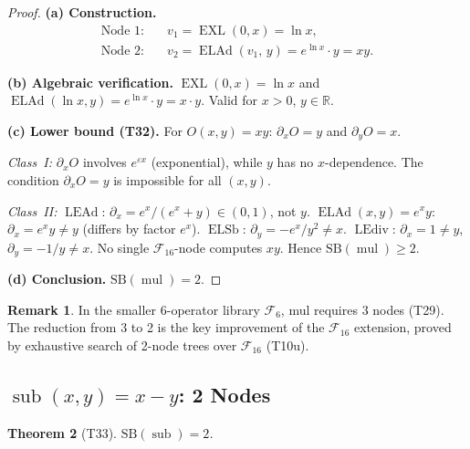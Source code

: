\documentclass[12pt,a4paper]{article}
\newtheorem{theorem}{Theorem}[section]
\theoremstyle{definition}
\newtheorem{remark}[theorem]{Remark}
\newcommand{\EXL}{\operatorname{EXL}}
\newcommand{\ELAd}{\operatorname{ELAd}}
\newcommand{\ELSb}{\operatorname{ELSb}}
\newcommand{\LEAd}{\operatorname{LEAd}}
\newcommand{\LEdiv}{\operatorname{LEdiv}}
\newcommand{\mulop}{\operatorname{mul}}
\newcommand{\subop}{\operatorname{sub}}
\newcommand{\SB}{\mathrm{SB}}
\newcommand{\F}{\mathcal{F}_{16}}
\newcommand{\R}{\mathbb{R}}
\begin{document}
\begin{proof}
\textbf{(a) Construction.}
\begin{align*}
  \text{Node 1:} &\quad v_1 = \EXL(0,x) = \ln x, \\
  \text{Node 2:} &\quad v_2 = \ELAd(v_1,\,y) = e^{\ln x} \cdot y = xy.
\end{align*}

\textbf{(b) Algebraic verification.}
$\EXL(0,x) = \ln x$ and $\ELAd(\ln x, y) = e^{\ln x} \cdot y = x \cdot y$.
Valid for $x > 0$, $y \in \R$.

\textbf{(c) Lower bound (T32).}
For $O(x,y) = xy$: $\partial_x O = y$ and $\partial_y O = x$.

\emph{Class~I:} $\partial_x O$ involves $e^{\varepsilon x}$ (exponential), while $y$ has
no $x$-dependence.  The condition $\partial_x O = y$ is impossible for all $(x,y)$.

\emph{Class~II:}
$\LEAd$: $\partial_x = e^x/(e^x+y) \in (0,1)$, not $y$.
$\ELAd(x,y) = e^x y$: $\partial_x = e^x y \ne y$ (differs by factor $e^x$).
$\ELSb$: $\partial_y = -e^x/y^2 \ne x$.
$\LEdiv$: $\partial_x = 1 \ne y$, $\partial_y = -1/y \ne x$.
No single $\F$-node computes $xy$.  Hence $\SB(\mulop) \ge 2$.

\textbf{(d) Conclusion.} $\SB(\mulop) = 2$.
\end{proof}

\begin{remark}
In the smaller 6-operator library $\mathcal{F}_6$, mul requires 3 nodes (T29).
The reduction from 3 to 2 is the key improvement of the $\mathcal{F}_{16}$ extension,
proved by exhaustive search of 2-node trees over $\mathcal{F}_{16}$ (T10u).
\end{remark}

\subsection{\texorpdfstring{$\subop(x,y) = x-y$}{sub(x,y)}: 2 Nodes}
\label{sec:sub}

\begin{theorem}[T33]
\label{thm:sub}
$\SB(\subop) = 2$.
\end{theorem}
\end{document}
